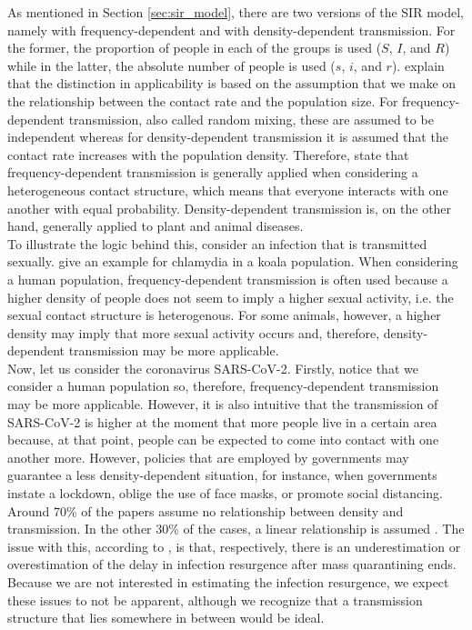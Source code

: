 \documentclass[12pt]{article}
\begin{document}
	As mentioned in Section \ref{sec:sir_model}, there are two versions of the SIR model, namely with frequency-dependent and with density-dependent transmission. For the former, the proportion of people in each of the groups is used ($S$, $I$, and $R$) while in the latter, the absolute number of people is used ($s$, $i$, and $r$). \textcite{keeling2011modeling} explain that the distinction in applicability is based on the assumption that we make on the relationship between the contact rate and the population size. For frequency-dependent transmission, also called random mixing, these are assumed to be independent whereas for density-dependent transmission it is assumed that the contact rate increases with the population density. Therefore, \textcite{keeling2011modeling} state that frequency-dependent transmission is generally applied when considering a heterogeneous contact structure, which means that everyone interacts with one another with equal probability. Density-dependent transmission is, on the other hand, generally applied to plant and animal diseases. \\
	
	To illustrate the logic behind this, consider an infection that is transmitted sexually. \textcite{keeling2011modeling} give an example for chlamydia in a koala population. When considering a human population, frequency-dependent transmission is often used because a higher density of people does not seem to imply a higher sexual activity, i.e. the sexual contact structure is heterogenous. For some animals, however, a higher density may imply that more sexual activity occurs and, therefore, density-dependent transmission may be more applicable. \\
	
	Now, let us consider the coronavirus SARS-CoV-2. Firstly, notice that we consider a human population so, therefore, frequency-dependent transmission may be more applicable. However, it is also intuitive that the transmission of SARS-CoV-2 is higher at the moment that more people live in a certain area because, at that point, people can be expected to come into contact with one another more. However, policies that are employed by governments may guarantee a less density-dependent situation, for instance, when governments instate a lockdown, oblige the use of face masks, or promote social distancing. Around 70\% of the papers assume no relationship between density and transmission. In the other 30\% of the cases, a linear relationship is assumed \parencite{nightingale2020importance}. The issue with this, according to \textcite{nightingale2020importance}, is that, respectively, there is an underestimation or overestimation of the delay in infection resurgence after mass quarantining ends. Because we are not interested in estimating the infection resurgence, we expect these issues to not be apparent, although we recognize that a transmission structure that lies somewhere in between would be ideal. \\
	
\end{document}
